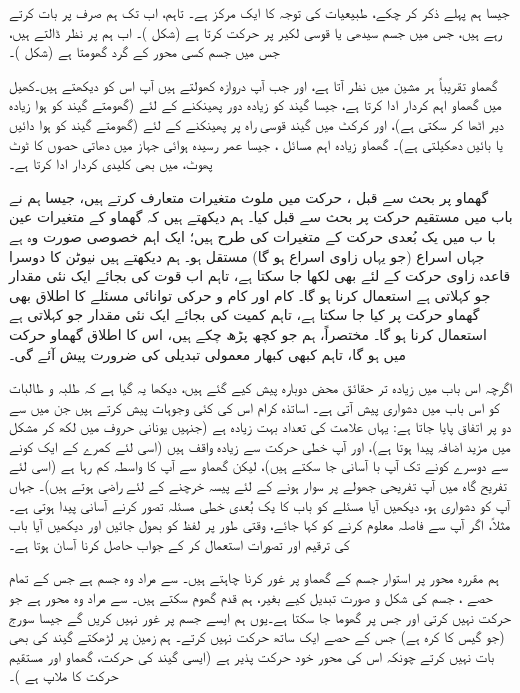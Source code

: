 جیسا ہم پہلے ذکر کر چکے، طبیعیات  کی توجہ کا ایک  مرکز ہے۔ تاہم، اب تک ہم صرف پر بات کرتے رہے ہیں، جس میں جسم سیدھی یا قوسی  لکیر  پر حرکت کرتا ہے (شکل )۔ اب ہم  پر نظر ڈالتے ہیں، جس میں جسم کسی محور کے گرد گھومتا ہے (شکل )۔

گھماو تقریباً ہر مشین میں نظر آتا ہے، اور جب  آپ دروازہ کھولتے ہیں آپ اس کو دیکھتے ہیں۔کھیل میں  گھماو اہم کردار ادا کرتا ہے، جیسا  گیند کو زیادہ دور پھینکنے کے لئے (گھومتے  گیند  کو ہوا زیادہ دیر  اٹھا  کر سکتی ہے)، اور کرکٹ میں گیند  قوسی  راہ پر پھینکنے کے لئے (گھومتے گیند کو ہوا دائیں یا بائیں دھکیلتی ہے)۔ گھماو زیادہ اہم مسائل ، جیسا      عمر رسیدہ  ہوائی جہاز میں دھاتی حصوں   کا ٹوٹ پھوٹ، میں بھی  کلیدی کردار ادا کرتا ہے۔

گھماو پر بحث سے قبل   ، حرکت میں ملوث متغیرات متعارف کرتے ہیں، جیسا ہم نے باب  میں مستقیم حرکت پر بحث سے قبل کیا۔ ہم دیکھتے ہیں کہ گھماو کے  متغیرات عین   با ب  میں یک بُعدی  حرکت  کے متغیرات کی طرح ہیں؛  ایک اہم خصوصی صورت وہ ہے جہاں اسراع (جو یہاں زاوی اسراع ہو گا)   مستقل ہو۔ ہم دیکھتے ہیں  نیوٹن کا دوسرا قاعدہ  زاوی حرکت کے لئے بھی لکھا جا سکتا ہے، تاہم  اب قوت  کی بجائے ایک نئی  مقدار جو  کہلاتی ہے استعمال  کرنا ہو گا۔  کام اور  کام و حرکی توانائی  مسئلے کا اطلاق   بھی گھماو  حرکت  پر کیا جا سکتا ہے، تاہم  کمیت کی بجائے ایک نئی مقدار جو  کہلاتی ہے استعمال کرنا ہو  گا۔ مختصراً،  ہم جو کچھ پڑھ چکے ہیں، اس کا اطلاق گھماو حرکت میں ہو گا، تاہم کبھی کبھار معمولی تبدیلی  کی ضرورت پیش آئے گی۔

اگرچہ اس باب میں زیادہ تر حقائق محض  دوبارہ پیش کیے گئے ہیں، دیکھا یہ گیا ہے کہ طلبہ و طالبات کو اس باب میں دشواری پیش آتی ہے۔ اساتذہ کرام اس کی کئی وجوہات پیش کرتے ہیں جن میں سے دو  پر اتفاق پایا جاتا ہے:  یہاں  علامت    کی تعداد بہت زیادہ ہے (جنہیں  یونانی حروف  میں لکھ کر  مشکل میں  مزید اضافہ پیدا ہوتا ہے)، اور   آپ خطی حرکت سے زیادہ واقف ہیں (اسی لئے  کمرے کے ایک کونے سے دوسرے کونے تک آپ  با آسانی جا سکتے ہیں)،  لیکن گھماو سے آپ کا واسطہ کم رہا ہے (اسی لئے تفریح  گاہ میں آپ  تفریحی جھولے پر سوار ہونے کے لئے پیسہ خرچنے کے لئے راضی ہوتے ہیں)۔ جہاں آپ کو دشواری ہو، دیکھیں آیا مسئلے کو  باب  کا یک بُعدی خطی مسئلہ   تصور کرنے  آسانی پیدا ہوتی ہے۔ مثلاً، اگر آپ سے فاصلہ معلوم کرنے کو کہا جائے، وقتی طور پر  لفظ  کو بھول جائیں اور دیکھیں آیا باب   کی ترقیم اور تصورات استعمال کر کے جواب حاصل کرنا آسان ہوتا ہے۔

ہم مقررہ محور  پر استوار  جسم کے گھماو  پر غور کرنا چاہتے ہیں۔ سے مراد  وہ جسم ہے جس  کے تمام  حصے  ، جسم کی شکل و صورت تبدیل کیے بغیر، ہم قدم  گھوم سکتے ہیں۔  سے مراد وہ محور ہے جو حرکت نہیں کرتی اور   جس  پر گھوما جا سکتا ہے۔یوں ہم ایسے جسم پر غور نہیں کریں گے جیسا  سورج   (جو گیس  کا کرہ  ہے) جس کے  حصے ایک ساتھ حرکت نہیں کرتے۔ ہم زمین پر  لڑھکتے گیند کی بھی بات نہیں کرتے چونکہ اس کی  محور خود حرکت پذیر ہے (ایسی گیند کی حرکت،   گھماو اور  مستقیم حرکت کا ملاپ ہے )۔

